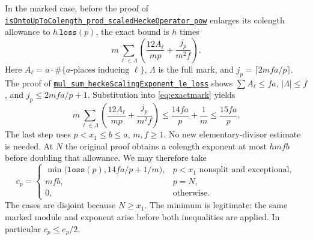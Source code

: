\documentclass[11pt,letterpaper]{article}
\theoremstyle{remark}\newtheorem{remark}[theorem]{Remark}
\newcommand{\src}[3]{\href{https://github.com/VladimirReshetnikov/ProveIt/blob/89d12dd40424f1217fd818d84877b3da52396a3b/Analysis/GeneralizedRiemannHypothesis/Lean/grh/src/#1.lean\#L#2}{\texttt{#3}}}
\begin{document}
In the marked case, before the proof of \src{New/UpperBound/Divisibility/LocalDivisibility}{331}{isOntoUpToColength\_prod\_scaledHeckeOperator\_pow} enlarges its colength allowance to $h\,\texttt{loss}(p)$, the exact bound is $h$ times
\begin{equation}\label{eq:exactmark}
 m\sum_{\ell\in\Lambda}\left(\frac{12A_\ell}{mp}+\frac{j_p}{m^2 f}\right).
\end{equation}
Here $A_\ell=a\cdot\#\{\text{$a$-places inducing }\ell\}$, $\Lambda$ is the full mark, and $j_p=\lceil 2mfa/p\rceil$. The proof of \src{New/UpperBound/Divisibility/LocalDivisibility}{294}{mul\_sum\_heckeScalingExponent\_le\_loss} shows $\sum A_\ell\le fa$, $|\Lambda|\le f$, and $j_p\le2mfa/p+1$. Substitution into \eqref{eq:exactmark} yields
\[
 m\sum_{\ell\in\Lambda}\left(\frac{12A_\ell}{mp}+\frac{j_p}{m^2 f}\right)
 \le \frac{14fa}{p}+\frac1m\le\frac{15fa}{p}.
\]
The last step uses $p<x_1\le b\le a$, $m,f\ge1$. No new elementary-divisor estimate is needed. At $N$ the original proof obtains a colength exponent at most $hmfb$ before doubling that allowance. We may therefore take
\begin{equation}\label{eq:cp}
 c_p=\begin{cases}
 \min\bigl(\texttt{loss}(p),14fa/p+1/m\bigr),&p<x_1\text{ nonsplit and exceptional},\\
 mfb,&p=N,\\
 0,&\text{otherwise}.
 \end{cases}
\end{equation}
The cases are disjoint because $N\ge x_1$. The minimum is legitimate: the same marked module and exponent arise before both inequalities are applied. In particular $c_p\le e_p/2$.
\end{document}
